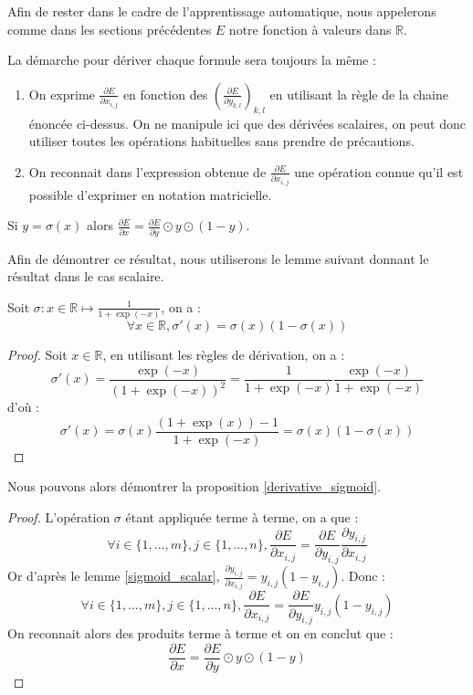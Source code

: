 Afin de rester dans le cadre de l'apprentissage automatique, nous appelerons comme dans les sections précédentes $E$ notre fonction à valeurs dans $\mathbb{R}$.

La démarche pour dériver chaque formule sera toujours la même :
\begin{enumerate}
\item On exprime $\frac{\partial E}{\partial x_{i, j}}$ en fonction des $(\frac{\partial E}{\partial y_{k, l}})_{k, l}$ en utilisant la règle de la chaine énoncée ci-dessus. On ne manipule ici que des dérivées scalaires, on peut donc utiliser toutes les opérations habituelles sans prendre de précautions.
\item On reconnait dans l'expression obtenue de $\frac{\partial E}{\partial x_{i, j}}$ une opération connue qu'il est possible d'exprimer en notation matricielle.
\end{enumerate}

\begin{proposition}
Si $y = \sigma(x)$ alors $\frac{\partial E}{\partial x} = \frac{\partial E}{\partial y} \odot y \odot (1 - y)$.
\label{derivative_sigmoid}
\end{proposition}

Afin de démontrer ce résultat, nous utiliserons le lemme suivant donnant le résultat dans le cas scalaire.

\begin{lemma}
Soit $\sigma : x \in \mathbb{R} \mapsto \frac{1}{1 + \exp(-x)}$, on a :
$$ 
\forall x \in \mathbb{R}, \sigma'(x) = \sigma(x)(1 - \sigma(x))
$$
\label{sigmoid_scalar}
\end{lemma}

\begin{proof}
Soit $x \in \mathbb{R}$, en utilisant les règles de dérivation, on a :
$$
\sigma'(x) = \frac{\exp(-x)}{(1 + \exp(-x))^2} = \frac{1}{1 + \exp(-x)}\frac{\exp(-x)}{1 + \exp(-x)}
$$
d'où :
$$
\sigma'(x) = \sigma(x)\frac{(1 + \exp(x)) - 1}{1 + \exp(-x)} =  \sigma(x)(1 - \sigma(x))
$$
\end{proof}

Nous pouvons alors démontrer la proposition \ref{derivative_sigmoid}.

\begin{proof}
L'opération $\sigma$ étant appliquée terme à terme, on a que :
$$
\forall i \in \{1, ..., m\}, j \in \{1, ..., n\}, \frac{\partial E}{\partial x_{i, j}} = \frac{\partial E}{\partial y_{i, j}}\frac{\partial y_{i, j}}{\partial x_{i, j}}
$$
Or d'après le lemme \ref{sigmoid_scalar}, $\frac{\partial y_{i, j}}{\partial x_{i, j}} = y_{i, j}(1 - y_{i, j})$. Donc :
$$
\forall i \in \{1, ..., m\}, j \in \{1, ..., n\}, \frac{\partial E}{\partial x_{i, j}} = \frac{\partial E}{\partial y_{i, j}}y_{i, j}(1 - y_{i, j})
$$
On reconnait alors des produits terme à terme et on en conclut que :
$$
\frac{\partial E}{\partial x} = \frac{\partial E}{\partial y} \odot y \odot (1 - y)
$$
\end{proof}

